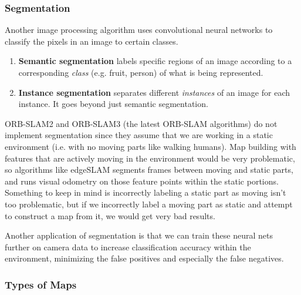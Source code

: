\documentclass{article}
\theoremstyle{definition}
\theoremstyle{remark}
\theoremstyle{definition}
\begin{document}
\subsubsection{Segmentation}

Another image processing algorithm uses convolutional neural networks to classify the pixels in an image to certain classes. 
\begin{enumerate}
    \item \textbf{Semantic segmentation} labels specific regions of an image according to a corresponding \textit{class} (e.g. fruit, person) of what is being represented. 
    \item \textbf{Instance segmentation} separates different \textit{instances} of an image for each instance. It goes beyond just semantic segmentation. 
\end{enumerate}
ORB-SLAM2 and ORB-SLAM3 (the latest ORB-SLAM algorithms) do not implement segmentation since they assume that we are working in a static environment (i.e. with no moving parts like walking humans). Map building with features that are actively moving in the environment would be very problematic, so algorithms like edgeSLAM segments frames between moving and static parts, and runs visual odometry on those feature points within the static portions. Something to keep in mind is incorrectly labeling a static part as moving isn't too problematic, but if we incorrectly label a moving part as static and attempt to construct a map from it, we would get very bad results. 

Another application of segmentation is that we can train these neural nets further on camera data to increase classification accuracy within the environment, minimizing the false positives and especially the false negatives. 

\subsubsection{Types of Maps}
\end{document}
